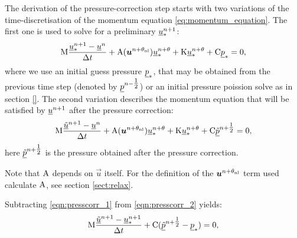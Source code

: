 The derivation of the pressure-correction step starts with two
variations of the time-discretisation of the
momentum equation \eqref{eq:momentum_equation}. The first
one is used to solve for a preliminary $\underline{u}_*^{n+1}$:
\begin{equation}\label{eqn:presscorr_1}
\mathrm{M}  \frac{{\underline{u}_*^{n+1}-\underline{u}^{n}}}{\Delta t}
    +\mathrm{A}({\mbox{\boldmath$u$}}^{n+\theta_{\mathrm{nl}}})\underline{u}_*^{n+\theta}+\mathrm{K}\underline{u}_*^{n+\theta}
    +\mathrm{C} \underline{p}_*
    =0,
\end{equation}
where we use an initial guess pressure $\underline{p}_*$, that may
be obtained from the previous time step (denoted by
$\underline{p}^{n-\tfrac 12}$) or an initial
pressure poission solve as in section \ref{}. The second variation
describes the momentum equation that will be satisfied by
$\underline{u}^{n+1}$ after the pressure correction:
\begin{equation}\label{eqn:presscorr_2}
\mathrm{M}  \frac{{\underline{\tilde u}^{n+1}-\underline{u}^{n}}}{\Delta t}
    +\mathrm{A}({\mbox{\boldmath$u$}}^{n+\theta_{\mathrm{nl}}})\underline{u}_*^{n+\theta}+\mathrm{K}\underline{u}_*^{n+\theta}
    +\mathrm{C} \underline{\tilde p}^{n+\tfrac 12}
    =0,
\end{equation}
here $\underline{\tilde p}^{n+\tfrac 12}$ is the pressure
obtained after the pressure correction.

Note that $\mathrm{A}$ depends on $\vec{u}$ itself. For the definition of the
${\mbox{\boldmath$u$}}^{n+\theta_{\mathrm{nl}}}$ term used calculate $\mathrm{A}$, see section \ref{sect:relax}.

Subtracting \eqref{eqn:presscorr_1} from \eqref{eqn:presscorr_2} yields:
\begin{equation}\label{eqn:presscorr_substract}
\mathrm{M}  \frac{{\underline{\tilde u}^{n+1}-\underline{u}_*^{n+1}}}{\Delta t}
    + \mathrm{C} ( \underline{\tilde p}^{n+\tfrac 12} - \underline{p}_*)
    =0,
\end{equation}

